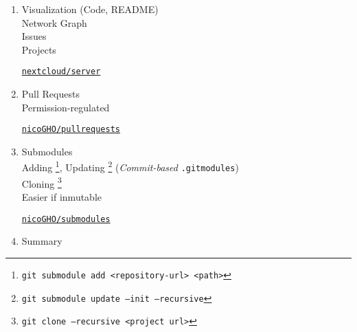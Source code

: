 \documentclass[12pt,a4paper]{article}
\begin{document}
\begin{enumerate}
				
		\newpage
		\item Visualization (Code, README) \\ Network Graph \\ Issues \\ Projects
		
		\vspace{1cm}
		\href{https://github.com/nextcloud/server}{\texttt{nextcloud/server}}
		
		\newpage
		\item Pull Requests \\ Permission-regulated
		
		\vspace{1cm}
		\href{https://github.com/nicoGHO/pullrequests}{\texttt{nicoGHO/pullrequests}}
		
		\newpage
		\item Submodules \\
		Adding \footnote{\texttt{git submodule add <repository-url> <path>}}, Updating \footnote{\texttt{git submodule update --init --recursive}} (\emph{Commit-based} \texttt{.gitmodules}) \\ Cloning \footnote{\texttt{git clone --recursive <project url>}} \\ Easier if inmutable
		
		\vspace{1cm}
		\href{https://github.com/nicoGHO/submodules}{\texttt{nicoGHO/submodules}}
		
		\vspace{2cm}
		
		
		\newpage
		\item Summary
		

\end{enumerate}
\end{document}
